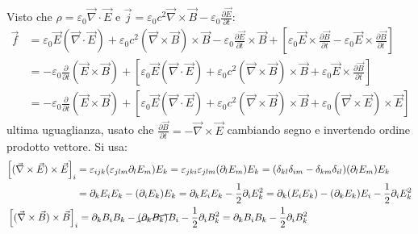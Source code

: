 \documentclass[10pt, a4paper]{scrartcl}
\numberwithin{equation}{subsection}
\theoremstyle{style1}
\begin{document}
Visto che $\rho  = \varepsilon _0 \vec{\nabla }\cdot \vec{E}$ e $\vec{j}=\varepsilon _0 c^2 \vec{\nabla }\times \vec{B}-\varepsilon_0 \frac{\partial \vec{E}}{\partial t} $:
\begin{equation*}
	\begin{split}
		\vec{f}&=\varepsilon _0 \vec{E}(\vec{\nabla }\cdot \vec{E}) + \varepsilon _0 c^2 (\vec{\nabla }\times \vec{B}) \times \vec{B} - \varepsilon _0 \frac{\partial  \vec{E}}{\partial  t} \times \vec{B} + \left[ \varepsilon _0 \vec{E}\times \frac{\partial \vec{B}}{\partial t} - \varepsilon _0\vec{E}\times \frac{\partial \vec{B}}{\partial t}  \right] \\
		       &=-\varepsilon _0 \frac{\partial }{\partial t} (\vec{E}\times \vec{B}) + \left[ \varepsilon _0 \vec{E}(\vec{\nabla }\cdot \vec{E}) +\varepsilon _0 c^2 (\vec{\nabla }\times \vec{B})\times \vec{B} + \varepsilon _0 \vec{E}\times \frac{\partial \vec{B}}{\partial t}  \right] \\
		       &=-\varepsilon _0 \frac{\partial }{\partial t} (\vec{E}\times \vec{B}) + \left[ \varepsilon _0 \vec{E}(\vec{\nabla }\cdot \vec{E}) +\varepsilon _0 c^2 (\vec{\nabla }\times \vec{B})\times \vec{B} + \varepsilon _0 (\vec{\nabla }\times \vec{E})\times \vec{E}  \right] 
	\end{split}
\end{equation*}
ultima uguaglianza, usato che $\frac{\partial \vec{B}}{\partial t} = - \vec{\nabla }\times \vec{E}$ cambiando segno e invertendo ordine prodotto vettore.
Si usa:
\begin{equation*}
	\begin{split}
		&\begin{split}
			\left[ (\vec{\nabla }\times \vec{E})\times \vec{E} \right] _i &= \varepsilon _{ijk} (\varepsilon _{jlm} \partial _l E_m) E_k = \varepsilon _{jki} \varepsilon _{jlm} (\partial _l E_m) E_k = (\delta _{kl} \delta _{im} -\delta _{km} \delta _{il} ) (\partial _{l} E_m) E_k\\
										      &=\partial _k E_i E_k - (\partial _i E_k) E_k = \partial _k E_i E_k - \frac{1}{2}\partial _i E_k^2=\partial _k(E_iE_k) - (\partial _k E_k) E_i - \frac{1}{2}\partial _i E_k^2
		\end{split}\\
		& \left[ (\vec{\nabla }\times \vec{B}) \times \vec{B} \right] _i = \partial _k B_i B_k - \cancel{(\partial _k B_k )} B_i - \frac{1}{2}\partial _i B_k^2=\partial _k B_i B_k - \frac{1}{2}\partial _i B_k^2
	\end{split}
\end{equation*}
\end{document}
